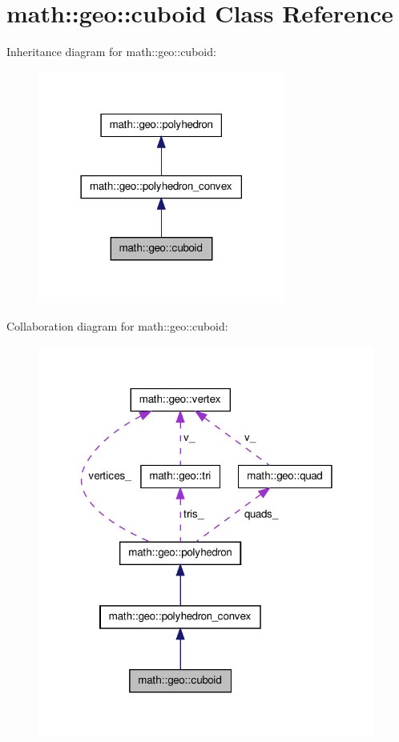 \hypertarget{classmath_1_1geo_1_1cuboid}{\section{math\-:\-:geo\-:\-:cuboid \-Class \-Reference}
\label{classmath_1_1geo_1_1cuboid}
}


\-Inheritance diagram for math\-:\-:geo\-:\-:cuboid\-:\nopagebreak
\begin{figure}[H]
\begin{center}
\leavevmode
\includegraphics[width=230pt]{classmath_1_1geo_1_1cuboid__inherit__graph}
\end{center}
\end{figure}


\-Collaboration diagram for math\-:\-:geo\-:\-:cuboid\-:\nopagebreak
\begin{figure}[H]
\begin{center}
\leavevmode
\includegraphics[width=314pt]{classmath_1_1geo_1_1cuboid__coll__graph}
\end{center}
\end{figure}
